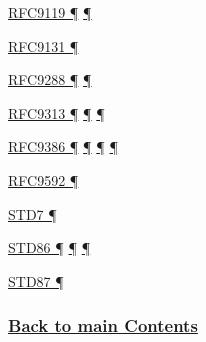 \documentclass[
]{article}
\begin{document}
\hyperref[address-resolution]{RFC9119 ¶} \hyperref[layer-2-functions]{¶}

\hyperref[address-resolution]{RFC9131 ¶}

\hyperref[extension-headers-and-options]{RFC9288 ¶}
\hyperref[filtering]{¶}

\hyperref[coexistence-with-legacy-ipv4]{RFC9313 ¶}
\hyperref[dual-stack-scenarios]{¶}
\hyperref[translation-and-ipv4-as-a-service]{¶}

\hyperref[dual-stack-scenarios]{RFC9386 ¶}
\hyperref[deployment-by-carriers]{¶}
\hyperref[deployment-in-the-enterprise]{¶} \hyperref[status]{¶}

\hyperref[addresses]{RFC9592 ¶}

\hyperref[transport-protocols]{STD7 ¶}

\hyperref[ipv6-basic-technology]{STD86 ¶}
\hyperref[extension-headers-and-options]{¶} \hyperref[markdown-usage]{¶}

\hyperref[extension-headers-and-options]{STD87 ¶}

\subsubsection{\texorpdfstring{\hyperref[list-of-contents]{Back to main
Contents}}{Back to main Contents}}\label{back-to-main-contents-12}

\pagebreak
\end{document}

